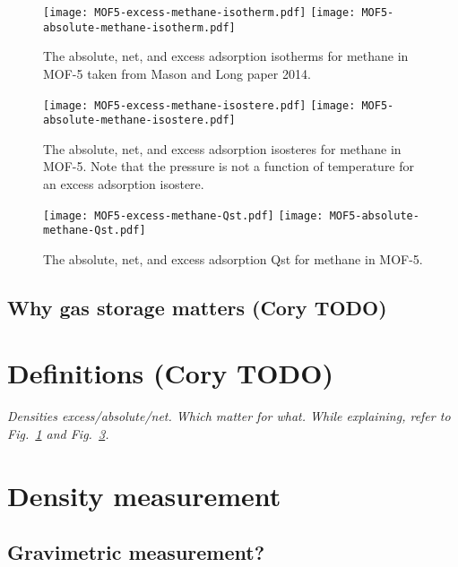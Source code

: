 \documentclass[letterpaper,twocolumn,amsmath,amssymb,jcp,aps,10pt]{revtex4-1}
\begin{document}
\begin{figure}
    \centering
    \texttt{[image: MOF5-excess-methane-isotherm.pdf]}
    \texttt{[image: MOF5-absolute-methane-isotherm.pdf]}
    \caption{The absolute, net, and excess adsorption isotherms for methane in MOF-5
    taken from Mason and Long paper 2014.}
    \label{fig:mof-5-isotherms}
\end{figure}
\begin{figure}
    \centering
    \texttt{[image: MOF5-excess-methane-isostere.pdf]}
    \texttt{[image: MOF5-absolute-methane-isostere.pdf]}
    \caption{The absolute, net, and excess adsorption isosteres for methane in MOF-5.  Note that the pressure is not a function of temperature for an excess adsorption isostere.}
    \label{fig:mof-5-isosteres}
\end{figure}

\begin{figure}
    \centering
    \texttt{[image: MOF5-excess-methane-Qst.pdf]}
    \texttt{[image: MOF5-absolute-methane-Qst.pdf]}
    \caption{The absolute, net, and excess adsorption Qst for methane in MOF-5.}
    \label{fig:mof-5-isosteres}
\end{figure}

\subsection{Why gas storage matters (Cory TODO)}

\section{Definitions (Cory TODO)}
\emph{Densities excess/absolute/net.  Which matter for what.  While explaining, refer to Fig.~\ref{fig:mof-5-isotherms} and Fig.~\ref{fig:mof-5-isosteres}.}

\section{Density measurement}
\subsection{Gravimetric measurement?}
\end{document}
